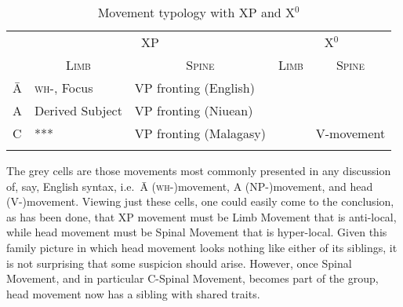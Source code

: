 \documentclass[output=paper,colorlinks,citecolor=brown,
]{langscibook}
\begin{document}
\begin{table}
\caption{Movement typology with XP and X$^0$\label{tab:table}}
\begin{tabular}{ l  l  l  l  l }
\lsptoprule
& \multicolumn{2}{c}{XP} & \multicolumn{2}{c}{X$^0$} \\\cmidrule(lr){2-3}\cmidrule(lr){4-5}
&\multicolumn{1}{c}{\textsc{Limb}} & \multicolumn{1}{c}{\textsc{Spine}} & \multicolumn{1}{c}{\textsc{Limb}} & \multicolumn{1}{c}{\textsc{Spine}} \\\midrule
\=A & \cellcolor{Gray}\textsc{wh-}, Focus & VP fronting (English) &  &  \\
A  & \cellcolor{Gray}Derived Subject&  VP fronting (Niuean)   &  &  \\
C  & ***  &    VP fronting (Malagasy) &  &  \cellcolor{Gray} V-movement\\
\lspbottomrule
\end{tabular}
\end{table}


The grey cells are those movements most commonly presented in any discussion of, say, English syntax, i.e.\ \=A (\textsc{wh-})movement, A (NP-)movement, and head (V-)movement.  Viewing just these cells, one could easily come to the conclusion, as has been done, that XP movement must be Limb Movement that is anti-local, while head movement must be Spinal Movement that is hyper-local.  Given this family picture in which head movement looks nothing like either of its siblings, it is not surprising that some suspicion should arise.  However, once Spinal Movement, and in particular C-Spinal Movement, becomes part of the group, head movement now has a sibling with shared traits.
\end{document}
